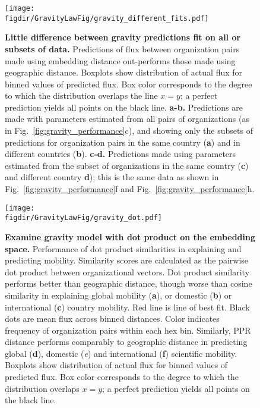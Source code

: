 \documentclass[12pt]{article} %
\def\figdir{../Figs}
\begin{document}
%
%
\begin{figure}[p!]
	\centering
	\texttt{[image: \\figdir/GravityLawFig/gravity\_different\_fits.pdf]}
	\caption{
		\textbf{Little difference between gravity predictions fit on all or subsets of data.}
		Predictions of flux between organization pairs made using embedding distance out-performs those made using geographic distance.
		Boxplots show distribution of actual flux for binned values of predicted flux.
		Box color corresponds to the degree to which the distribution overlaps the line $x = y$; 
		a perfect prediction yields all points on the black line.
		\textbf{a-b.} Predictions are made with parameters estimated from all pairs of organizations (as in Fig.~\ref{fig:gravity_performance}c), and showing only the subsets of predictions for organization pairs in the same country (\textbf{a}) and in different countries (\textbf{b}).
		\textbf{c-d.} Predictions made using parameters estimated from the subset of organizations in the same country (\textbf{c}) and different country \textbf{d});
		this is the same data as shown in Fig.~\ref{fig:gravity_performance}f and Fig.~\ref{fig:gravity_performance}h.
	}
	\label{fig:supp:gravity_prediction_subsets}
\end{figure}



%
%
\begin{figure}[p!]
	\centering
	\texttt{[image: \\figdir/GravityLawFig/gravity\_dot.pdf]}
	\caption{
		\textbf{Examine gravity model with dot product on the embedding space.}
		Performance of dot product similarities in explaining and predicting mobility.
		Similarity scores are calculated as the pairwise dot product between organizational vectors.
		Dot product similarity performs better than geographic distance, though worse than cosine similarity in explaining global mobility (\textbf{a}), or domestic (\textbf{b}) or international (\textbf{c}) country mobility.
		Red line is line of best fit.
		Black dots are mean flux across binned distances.
		Color indicates frequency of organization pairs within each hex bin.
		Similarly, PPR distance performs comparably to geographic distance in predicting global (\textbf{d}), domestic (\textit{e}) and international (\textbf{f}) scientific mobility.
		Boxplots show distribution of actual flux for binned values of predicted flux.
		Box color corresponds to the degree to which the distribution overlaps $x = y$;
		a perfect prediction yields all points on the black line.
	}
	\label{fig:supp:gravity_dot}
\end{figure}
\end{document}

